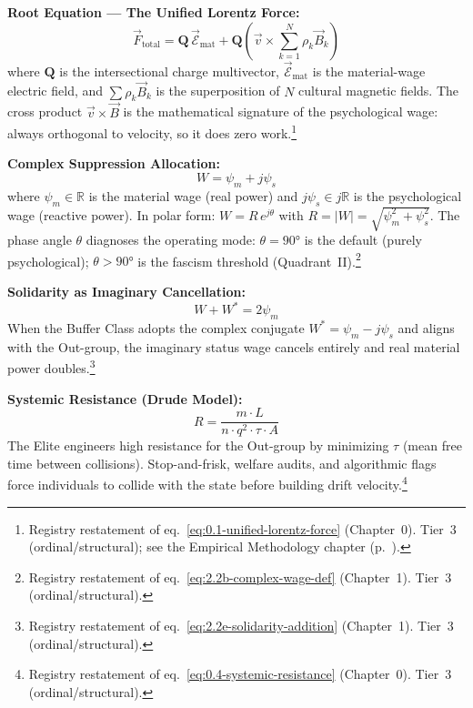 \begin{definition}
\textbf{Root Equation --- The Unified Lorentz Force:}
\begin{equation}\label{eq:19.5-unified-lorentz-force-registry}
\vec{F}_{\text{total}} = \mathbf{Q}\,\vec{\mathcal{E}}_{\text{mat}} + \mathbf{Q}\left(\vec{v} \times \sum_{k=1}^{N} \rho_k \vec{B}_k\right)
\end{equation}
where $\mathbf{Q}$ is the intersectional charge multivector,
$\vec{\mathcal{E}}_{\text{mat}}$ is the material-wage electric field,
and $\sum \rho_k \vec{B}_k$ is the superposition of $N$ cultural magnetic
fields. The cross product $\vec{v} \times \vec{B}$ is the mathematical
signature of the psychological wage: always orthogonal to velocity, so it
does zero work.\footnote{Registry restatement of eq.~\eqref{eq:0.1-unified-lorentz-force} (Chapter~0). Tier~3 (ordinal/structural); see the Empirical Methodology chapter (p.~\pageref{ch:empirical_methodology}).}

\textbf{Complex Suppression Allocation:}
\begin{equation}\label{eq:19.6-complex-wage-registry}
W = \psi_m + j\psi_s
\end{equation}
where $\psi_m \in \mathbb{R}$ is the material wage (real power) and
$j\psi_s \in j\mathbb{R}$ is the psychological wage (reactive power). In
polar form: $W = R\,e^{j\theta}$ with $R = |W| = \sqrt{\psi_m^2 + \psi_s^2}$.
The phase angle $\theta$ diagnoses the operating mode:
$\theta = 90°$ is the default (purely psychological);
$\theta > 90°$ is the fascism threshold (Quadrant~II).\footnote{Registry restatement of eq.~\eqref{eq:2.2b-complex-wage-def} (Chapter~1). Tier~3 (ordinal/structural).}

\textbf{Solidarity as Imaginary Cancellation:}
\begin{equation}\label{eq:19.7-solidarity-cancellation-registry}
W + W^* = 2\psi_m
\end{equation}
When the Buffer Class adopts the complex conjugate $W^* = \psi_m - j\psi_s$
and aligns with the Out-group, the imaginary status wage cancels entirely
and real material power doubles.\footnote{Registry restatement of eq.~\eqref{eq:2.2e-solidarity-addition} (Chapter~1). Tier~3 (ordinal/structural).}

\textbf{Systemic Resistance (Drude Model):}
\begin{equation}\label{eq:19.8-systemic-resistance-registry}
R = \frac{m \cdot L}{n \cdot q^2 \cdot \tau \cdot A}
\end{equation}
The Elite engineers high resistance for the Out-group by minimizing $\tau$
(mean free time between collisions). Stop-and-frisk, welfare audits, and
algorithmic flags force individuals to collide with the state before building
drift velocity.\footnote{Registry restatement of eq.~\eqref{eq:0.4-systemic-resistance} (Chapter~0). Tier~3 (ordinal/structural).}


\end{definition}
